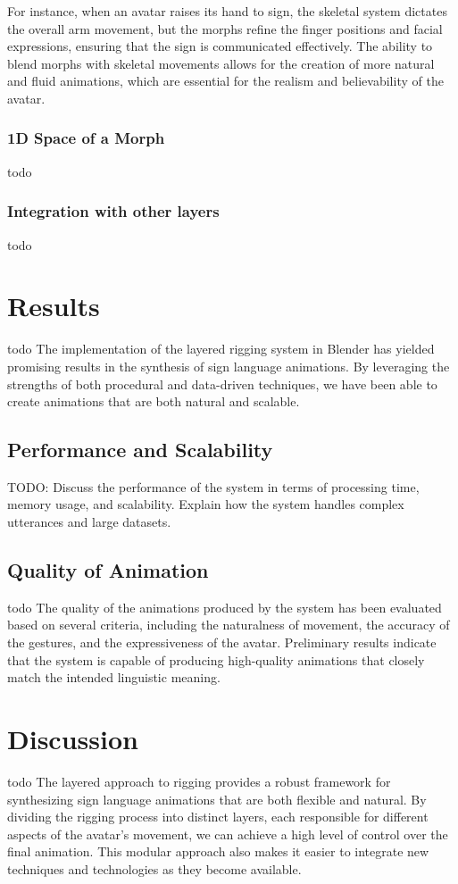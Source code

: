 \documentclass[../../main.tex]{subfiles}
\begin{document}
For instance, when an avatar raises its hand to sign, the skeletal system dictates the overall arm movement, but the morphs refine the finger positions and facial expressions, ensuring that the sign is communicated effectively. The ability to blend morphs with skeletal movements allows for the creation of more natural and fluid animations, which are essential for the realism and believability of the avatar.

\subsubsection{1D Space of a Morph}
todo

\subsubsection{Integration with other layers}
todo

\section{Results}
todo The implementation of the layered rigging system in Blender has yielded promising results in the synthesis of sign language animations. By leveraging the strengths of both procedural and data-driven techniques, we have been able to create animations that are both natural and scalable.

\subsection{Performance and Scalability}
TODO: Discuss the performance of the system in terms of processing time, memory usage, and scalability. Explain how the system handles complex utterances and large datasets.

\subsection{Quality of Animation}
todo The quality of the animations produced by the system has been evaluated based on several criteria, including the naturalness of movement, the accuracy of the gestures, and the expressiveness of the avatar. Preliminary results indicate that the system is capable of producing high-quality animations that closely match the intended linguistic meaning.

\section{Discussion}
todo The layered approach to rigging provides a robust framework for synthesizing sign language animations that are both flexible and natural. By dividing the rigging process into distinct layers, each responsible for different aspects of the avatar's movement, we can achieve a high level of control over the final animation. This modular approach also makes it easier to integrate new techniques and technologies as they become available.
\end{document}
